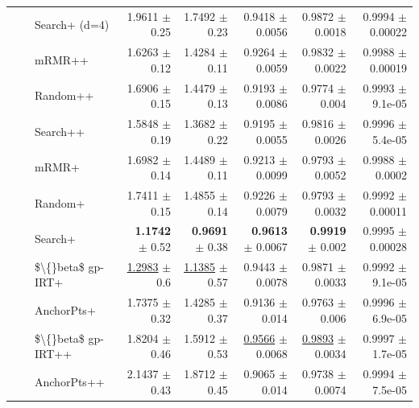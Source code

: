 \begin{longtable}{llp{}rrrrr}
 &  & Search+ (d=4) & 1.9611 {\scriptsize $\pm$ 0.25} & 1.7492 {\scriptsize $\pm$ 0.23} & 0.9418 {\scriptsize $\pm$ 0.0056} & 0.9872 {\scriptsize $\pm$ 0.0018} & 0.9994 {\scriptsize $\pm$ 0.00022} \\
 &  & mRMR++ & 1.6263 {\scriptsize $\pm$ 0.12} & 1.4284 {\scriptsize $\pm$ 0.11} & 0.9264 {\scriptsize $\pm$ 0.0059} & 0.9832 {\scriptsize $\pm$ 0.0022} & 0.9988 {\scriptsize $\pm$ 0.00019} \\
 &  & Random++ & 1.6906 {\scriptsize $\pm$ 0.15} & 1.4479 {\scriptsize $\pm$ 0.13} & 0.9193 {\scriptsize $\pm$ 0.0086} & 0.9774 {\scriptsize $\pm$ 0.004} & 0.9993 {\scriptsize $\pm$ 9.1e-05} \\
 &  & Search++ & 1.5848 {\scriptsize $\pm$ 0.19} & 1.3682 {\scriptsize $\pm$ 0.22} & 0.9195 {\scriptsize $\pm$ 0.0055} & 0.9816 {\scriptsize $\pm$ 0.0026} & 0.9996 {\scriptsize $\pm$ 5.4e-05} \\
 &  & mRMR+ & 1.6982 {\scriptsize $\pm$ 0.14} & 1.4489 {\scriptsize $\pm$ 0.11} & 0.9213 {\scriptsize $\pm$ 0.0099} & 0.9793 {\scriptsize $\pm$ 0.0052} & 0.9988 {\scriptsize $\pm$ 0.0002} \\
 &  & Random+ & 1.7411 {\scriptsize $\pm$ 0.15} & 1.4855 {\scriptsize $\pm$ 0.14} & 0.9226 {\scriptsize $\pm$ 0.0079} & 0.9793 {\scriptsize $\pm$ 0.0032} & 0.9992 {\scriptsize $\pm$ 0.00011} \\
 &  & Search+ & \textbf{1.1742} {\scriptsize $\pm$ 0.52} & \textbf{0.9691} {\scriptsize $\pm$ 0.38} & \textbf{0.9613} {\scriptsize $\pm$ 0.0067} & \textbf{0.9919} {\scriptsize $\pm$ 0.002} & 0.9995 {\scriptsize $\pm$ 0.00028} \\
 &  & \$\textbackslash\{\}beta\$ gp-IRT+ & \underline{1.2983} {\scriptsize $\pm$ 0.6} & \underline{1.1385} {\scriptsize $\pm$ 0.57} & 0.9443 {\scriptsize $\pm$ 0.0078} & 0.9871 {\scriptsize $\pm$ 0.0033} & 0.9992 {\scriptsize $\pm$ 9.1e-05} \\
 &  & AnchorPts+ & 1.7375 {\scriptsize $\pm$ 0.32} & 1.4285 {\scriptsize $\pm$ 0.37} & 0.9136 {\scriptsize $\pm$ 0.014} & 0.9763 {\scriptsize $\pm$ 0.006} & 0.9996 {\scriptsize $\pm$ 6.9e-05} \\
 &  & \$\textbackslash\{\}beta\$ gp-IRT++ & 1.8204 {\scriptsize $\pm$ 0.46} & 1.5912 {\scriptsize $\pm$ 0.53} & \underline{0.9566} {\scriptsize $\pm$ 0.0068} & \underline{0.9893} {\scriptsize $\pm$ 0.0034} & 0.9997 {\scriptsize $\pm$ 1.7e-05} \\
 &  & AnchorPts++ & 2.1437 {\scriptsize $\pm$ 0.43} & 1.8712 {\scriptsize $\pm$ 0.45} & 0.9065 {\scriptsize $\pm$ 0.014} & 0.9738 {\scriptsize $\pm$ 0.0074} & 0.9994 {\scriptsize $\pm$ 7.5e-05} \\

\end{longtable}
